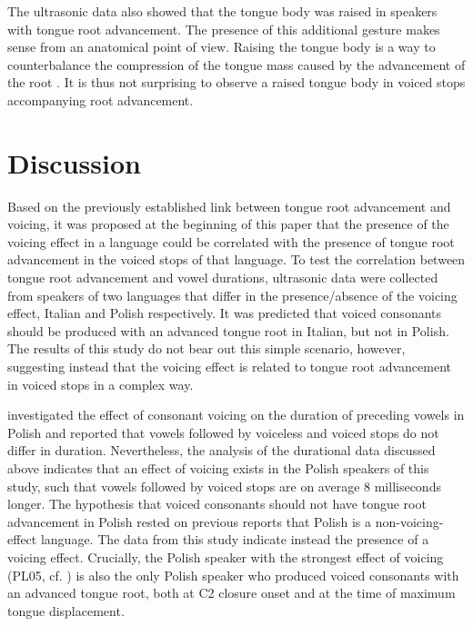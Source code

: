 \documentclass[authoryear, twocolumn]{elsarticle}
\begin{document}
The ultrasonic data also showed that the tongue body was raised in
speakers with tongue root advancement. The presence of this additional
gesture makes sense from an anatomical point of view. Raising the tongue
body is a way to counterbalance the compression of the tongue mass
caused by the advancement of the root
\citep{perkell1969, jackson1988, sproat1993, kingston1997, fulop1998}.
It is thus not surprising to observe a raised tongue body in voiced
stops accompanying root advancement.

\section{Discussion}\label{discussion}

\label{s:discussion}

Based on the previously established link between tongue root advancement
and voicing, it was proposed at the beginning of this paper that the
presence of the voicing effect in a language could be correlated with
the presence of tongue root advancement in the voiced stops of that
language. To test the correlation between tongue root advancement and
vowel durations, ultrasonic data were collected from speakers of two
languages that differ in the presence/absence of the voicing effect,
Italian and Polish respectively. It was predicted that voiced consonants
should be produced with an advanced tongue root in Italian, but not in
Polish. The results of this study do not bear out this simple scenario,
however, suggesting instead that the voicing effect is related to tongue
root advancement in voiced stops in a complex way.

\citet{keating1984} investigated the effect of consonant voicing on the
duration of preceding vowels in Polish and reported that vowels followed
by voiceless and voiced stops do not differ in duration. Nevertheless,
the analysis of the durational data discussed above indicates that an
effect of voicing exists in the Polish speakers of this study, such that
vowels followed by voiced stops are on average 8 milliseconds longer.
The hypothesis that voiced consonants should not have tongue root
advancement in Polish rested on previous reports that Polish is a
non-voicing-effect language. The data from this study indicate instead
the presence of a voicing effect. Crucially, the Polish speaker with the
strongest effect of voicing (PL05, cf. ) is also
the only Polish speaker who produced voiced consonants with an advanced
tongue root, both at C2 closure onset and at the time of maximum tongue
displacement.
\end{document}
